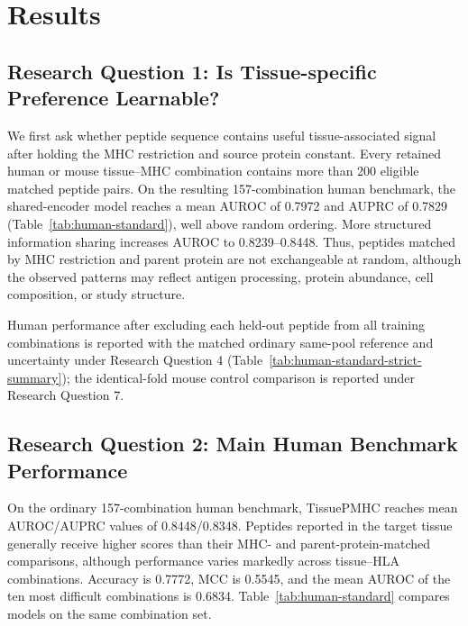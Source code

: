 \section{Results}

\subsection{Research Question 1: Is Tissue-specific Preference Learnable?}

We first ask whether peptide sequence contains useful tissue-associated signal after holding the MHC restriction and source protein constant. Every retained human or mouse tissue--MHC combination contains more than 200 eligible matched peptide pairs. On the resulting 157-combination human benchmark, the shared-encoder model reaches a mean AUROC of 0.7972 and AUPRC of 0.7829 (Table~\ref{tab:human-standard}), well above random ordering. More structured information sharing increases AUROC to 0.8239--0.8448. Thus, peptides matched by MHC restriction and parent protein are not exchangeable at random, although the observed patterns may reflect antigen processing, protein abundance, cell composition, or study structure.

Human performance after excluding each held-out peptide from all training combinations is reported with the matched ordinary same-pool reference and uncertainty under Research Question 4 (Table~\ref{tab:human-standard-strict-summary}); the identical-fold mouse control comparison is reported under Research Question 7.

\subsection{Research Question 2: Main Human Benchmark Performance}

On the ordinary 157-combination human benchmark, TissuePMHC reaches mean AUROC/AUPRC values of 0.8448/0.8348. Peptides reported in the target tissue generally receive higher scores than their MHC- and parent-protein-matched comparisons, although performance varies markedly across tissue--HLA combinations. Accuracy is 0.7772, MCC is 0.5545, and the mean AUROC of the ten most difficult combinations is 0.6834. Table~\ref{tab:human-standard} compares models on the same combination set.


